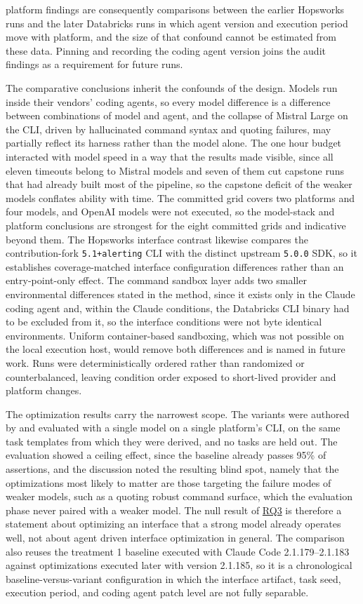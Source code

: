 \documentclass[
english,                 %
bibtex,                  %
]{kththesis}
\numberwithin{listing}{chapter}
\begin{document}
platform findings are consequently comparisons between the earlier Hopsworks runs and the later Databricks runs in which agent version and execution period move with platform, and the size of that confound cannot be estimated from these data. Pinning and recording the coding agent version joins the audit findings as a requirement for future runs.

The comparative conclusions inherit the confounds of the design. Models run inside their vendors' coding agents, so every model difference is a difference between combinations of model and agent, and the collapse of Mistral Large on the \gls{CLI}, driven by hallucinated command syntax and quoting failures, may partially reflect its harness rather than the model alone. The one hour budget interacted with model speed in a way that the results made visible, since all eleven timeouts belong to Mistral models and seven of them cut capstone runs that had already built most of the pipeline, so the capstone deficit of the weaker models conflates ability with time. The committed grid covers two platforms and four models, and \gls{OpenAI} models were not executed, so the model-stack and platform conclusions are strongest for the eight committed grids and indicative beyond them. The Hopsworks interface contrast likewise compares the contribution-fork \texttt{5.1+alerting} \gls{CLI} with the distinct upstream \texttt{5.0.0} \gls{SDK}, so it establishes coverage-matched interface configuration differences rather than an entry-point-only effect. The command sandbox layer adds two smaller environmental differences stated in the method, since it exists only in the Claude coding agent and, within the Claude conditions, the Databricks \gls{CLI} binary had to be excluded from it, so the interface conditions were not byte identical environments. Uniform container-based sandboxing, which was not possible on the local execution host, would remove both differences and is named in future work. Runs were deterministically ordered rather than randomized or counterbalanced, leaving condition order exposed to short-lived provider and platform changes.

The optimization results carry the narrowest scope. The variants were authored by and evaluated with a single model on a single platform's \gls{CLI}, on the same task templates from which they were derived, and no tasks are held out. The evaluation showed a ceiling effect, since the baseline already passes 95\% of assertions, and the discussion noted the resulting blind spot, namely that the optimizations most likely to matter are those targeting the failure modes of weaker models, such as a quoting robust command surface, which the evaluation phase never paired with a weaker model. The null result of \hyperref[rq3]{RQ3} is therefore a statement about optimizing an interface that a strong model already operates well, not about agent driven interface optimization in general. The comparison also reuses the treatment 1 baseline executed with Claude Code 2.1.179--2.1.183 against optimizations executed later with version 2.1.185, so it is a chronological baseline-versus-variant configuration in which the interface artifact, task seed, execution period, and coding agent patch level are not fully separable.
\end{document}
